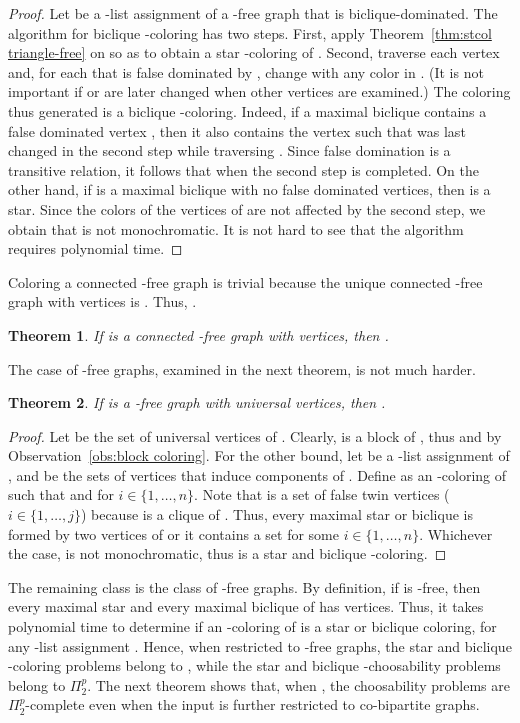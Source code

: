 \documentclass[a4paper, 11pt, oneside]{article}
\newtheorem{theorem}{Theorem}
\newcommand{\ptwop}{\ensuremath{\Pi^p_2}\xspace}
\newcommand{\range}[3]{\ensuremath{#1 \in \{#2,\ldots,#3\}}}
\begin{document}
\begin{proof}
  Let  be a -list assignment of a -free graph  that is biclique-dominated.  The algorithm for biclique -coloring  has two steps.  First, apply Theorem~\ref{thm:stcol triangle-free} on  so as to obtain a star -coloring  of .  Second, traverse each vertex  and, for each  that is false dominated by , change  with any color in .  (It is not important if  or  are later changed when other vertices are examined.) The coloring thus generated is a biclique -coloring.  Indeed, if a maximal biclique contains a false dominated vertex , then it also contains the vertex  such that  was last changed in the second step while traversing .  Since false domination is a transitive relation, it follows that  when the second step is completed.  On the other hand, if  is a maximal biclique with no false dominated vertices, then  is a star.  Since the colors of the vertices of  are not affected by the second step, we obtain that  is not monochromatic.  It is not hard to see that the algorithm requires polynomial time.
\end{proof}

Coloring a connected -free graph is trivial because the unique connected -free graph  with  vertices is .  Thus, .

\begin{theorem}
 If  is a connected -free graph with  vertices, then .
\end{theorem}

The case of -free graphs, examined in the next theorem, is not much harder.

\begin{theorem}
 If  is a -free graph with  universal vertices, then .
\end{theorem}

\begin{proof}
 Let  be the set of universal vertices of .  Clearly,  is a block of , thus  and  by Observation~\ref{obs:block coloring}.  For the other bound, let  be a -list assignment of , and  be the sets of vertices that induce components of .  Define  as an -coloring of  such that  and  for \range{i}{1}{n}.  Note that  is a set of false twin vertices (\range{i}{1}{j}) because  is a clique of .  Thus, every maximal star or biclique  is formed by two vertices of  or it contains a set  for some \range{i}{1}{n}.  Whichever the case,  is not monochromatic, thus  is a star and biclique -coloring.
\end{proof}

The remaining class is the class of -free graphs.  By definition, if  is -free, then every maximal star and every maximal biclique of  has  vertices.  Thus, it takes polynomial time to determine if an -coloring of  is a star or biclique coloring, for any -list assignment .  Hence, when restricted to -free graphs, the star and biclique -coloring problems belong to \NP, while the star and biclique -choosability problems belong to \ptwop.  The next theorem shows that, when , the choosability problems are \ptwop-complete even when the input is further restricted to co-bipartite graphs.
\end{document}
